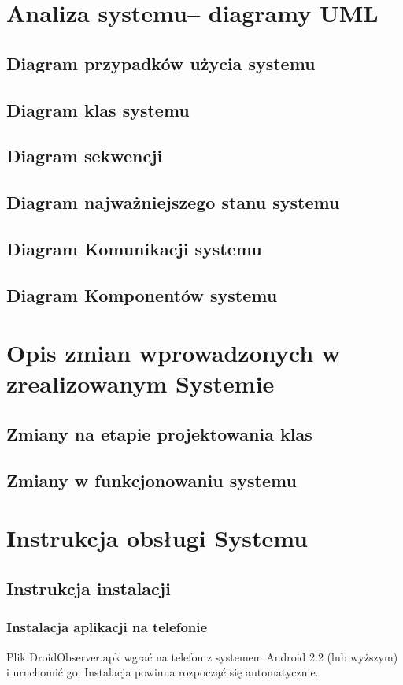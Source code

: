 \documentclass[11pt,a4paper]{article}
\begin{document}
\section {Analiza systemu– diagramy UML}
\subsection {Diagram przypadków użycia systemu}
\subsection {Diagram klas systemu}
\subsection {Diagram sekwencji}
\subsection {Diagram najważniejszego stanu systemu}
\subsection {Diagram Komunikacji systemu}
\subsection {Diagram Komponentów systemu}

\section {Opis zmian wprowadzonych w zrealizowanym Systemie }
\subsection {Zmiany na etapie projektowania klas}
\subsection {Zmiany w funkcjonowaniu systemu}

\newpage
\section {Instrukcja obsługi Systemu}
\subsection{Instrukcja instalacji}

\subsubsection{Instalacja aplikacji na telefonie}
Plik DroidObserver.apk wgrać na telefon z systemem Android 2.2 (lub wyższym) i uruchomić go.
Instalacja powinna rozpocząć się automatycznie.
\end{document}
